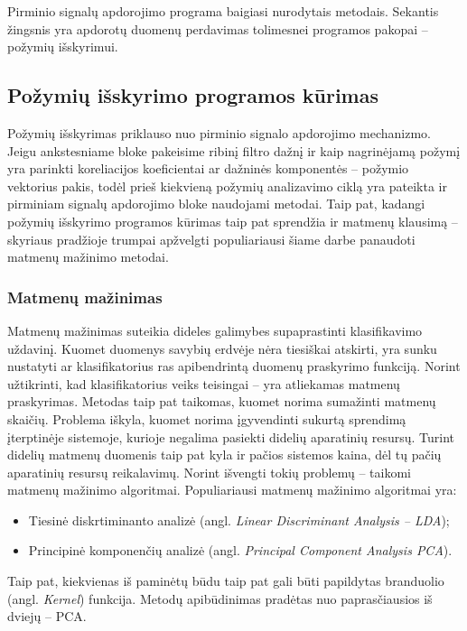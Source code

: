 \documentclass[]{vgtuef}
\begin{document}
Pirminio signalų apdorojimo programa baigiasi nurodytais metodais. Sekantis žingsnis yra apdorotų duomenų perdavimas tolimesnei programos pakopai -- požymių išskyrimui.

\subsection{Požymių išskyrimo programos kūrimas}

Požymių išskyrimas priklauso nuo pirminio signalo apdorojimo mechanizmo. Jeigu ankstesniame bloke pakeisime ribinį filtro dažnį ir kaip nagrinėjamą požymį yra parinkti koreliacijos koeficientai ar dažninės komponentės -- požymio vektorius pakis, todėl prieš kiekvieną požymių analizavimo ciklą yra pateikta ir pirminiam signalų apdorojimo bloke naudojami metodai. Taip pat, kadangi požymių išskyrimo programos kūrimas taip pat sprendžia ir matmenų klausimą -- skyriaus pradžioje trumpai apžvelgti populiariausi šiame darbe panaudoti matmenų mažinimo metodai.

\subsubsection{Matmenų mažinimas}

Matmenų mažinimas suteikia dideles galimybes supaprastinti klasifikavimo uždavinį. Kuomet duomenys savybių erdvėje nėra tiesiškai atskirti, yra sunku nustatyti ar klasifikatorius ras apibendrintą duomenų praskyrimo funkciją. Norint užtikrinti, kad klasifikatorius veiks teisingai -- yra atliekamas matmenų praskyrimas. Metodas taip pat taikomas, kuomet norima sumažinti matmenų skaičių. Problema iškyla, kuomet norima įgyvendinti sukurtą sprendimą įterptinėje sistemoje, kurioje negalima pasiekti didelių aparatinių resursų. Turint didelių matmenų duomenis taip pat kyla ir pačios sistemos kaina, dėl tų pačių aparatinių resursų reikalavimų. Norint išvengti tokių problemų -- taikomi matmenų mažinimo algoritmai. Populiariausi matmenų mažinimo algoritmai yra:

\begin{itemize}
\item Tiesinė diskrtiminanto analizė (angl. \textit{Linear Discriminant Analysis -- LDA});
\item Principinė komponenčių analizė (angl. \textit{Principal Component Analysis PCA}).
\end{itemize}

Taip pat, kiekvienas iš paminėtų būdu taip pat gali būti papildytas branduolio (angl. \textit{Kernel}) funkcija. Metodų apibūdinimas pradėtas nuo paprasčiausios iš dviejų -- PCA.
\end{document}
